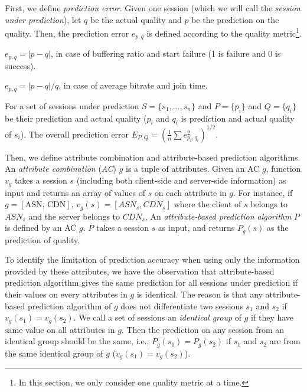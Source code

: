 \label{subsec:upperbound}

First, we define {\it prediction error}. 
Given one session (which we will call the {\it session under prediction}), let $q$ be the actual quality and $p$ be the prediction on the quality. Then, the prediction error $e_{p,q}$ is defined according to the quality metric\footnote{In this section, we only consider one quality metric at a time.}.
\begin{packeditemize}
	\item $e_{p,q}=|p-q|$, in case of buffering ratio and start failure (1 is failure and 0 is success).
	\item $e_{p,q}=|p-q|/q$, in case of average bitrate and join time.
\end{packeditemize}
For a set of sessions under prediction $S=\{s_1,\dots,s_n\}$ and $P=\{p_i\}$ and $Q=\{q_i\}$ be their prediction and actual quality ($p_i$ and $q_i$ is prediction and actual quality of $s_i$). The overall prediction error $E_{P,Q}=\left(\frac{1}{n}\sum e_{p_i,q_i}^2\right)^{1/2}$.

Then, we define attribute combination and attribute-based prediction algorithms.
An {\it attribute combination} ({\it AC}) $g$ is a tuple of attributes. Given an AC $g$, function $v_g$ takes a session $s$ (including both client-side and server-side information) as input and returns an array of values of $s$ on each attribute in $g$. For instance, if $g=[\textrm{ASN, CDN}]$, $v_g(s)=[ASN_s,CDN_s]$ where the client of $s$ belongs to $ASN_s$ and the server belongs to $CDN_s$.
An {\it attribute-based prediction algorithm} $P$ is defined by an AC $g$. $P$ takes a session $s$ as input, and returns $P_g(s)$ as the prediction of quality.
 
To identify the limitation of prediction accuracy when using only the information provided by these attributes, we have the observation that attribute-based prediction algorithm gives the same prediction for all sessions under prediction if their values on every attributes in $g$  is identical. The reason is that any attribute-based prediction algorithm of $g$ does not differentiate two sessions $s_1$ and $s_2$ if $v_g(s_1)=v_g(s_2)$. We call a set of sessions an {\it identical group} of $g$ if they have same value on all attributes in $g$. Then the prediction on any session from an identical group should be the same, i.e., $P_g(s_1)=P_g(s_2)$ if $s_1$ and $s_2$ are from the same identical group of $g$ ($v_g(s_1)=v_g(s_2)$). 


